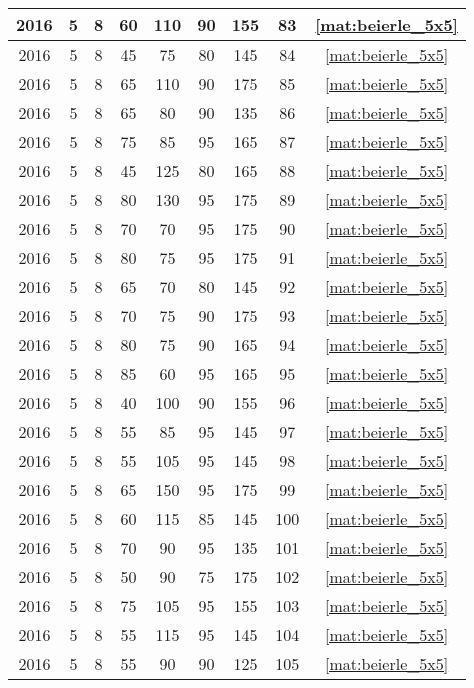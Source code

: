 \begin{longtable}{|c|c|c|c|c|c|c|c|c|}
2016 & 5 & 8 & 60 & 110 & 90 & 155 & 83 & \eqref{mat:beierle_5x5} \\ \hline 
2016 & 5 & 8 & 45 & 75 & 80 & 145 & 84 & \eqref{mat:beierle_5x5} \\ \hline 
2016 & 5 & 8 & 65 & 110 & 90 & 175 & 85 & \eqref{mat:beierle_5x5} \\ \hline 
2016 & 5 & 8 & 65 & 80 & 90 & 135 & 86 & \eqref{mat:beierle_5x5} \\ \hline 
2016 & 5 & 8 & 75 & 85 & 95 & 165 & 87 & \eqref{mat:beierle_5x5} \\ \hline 
2016 & 5 & 8 & 45 & 125 & 80 & 165 & 88 & \eqref{mat:beierle_5x5} \\ \hline 
2016 & 5 & 8 & 80 & 130 & 95 & 175 & 89 & \eqref{mat:beierle_5x5} \\ \hline 
2016 & 5 & 8 & 70 & 70 & 95 & 175 & 90 & \eqref{mat:beierle_5x5} \\ \hline 
2016 & 5 & 8 & 80 & 75 & 95 & 175 & 91 & \eqref{mat:beierle_5x5} \\ \hline 
2016 & 5 & 8 & 65 & 70 & 80 & 145 & 92 & \eqref{mat:beierle_5x5} \\ \hline 
2016 & 5 & 8 & 70 & 75 & 90 & 175 & 93 & \eqref{mat:beierle_5x5} \\ \hline 
2016 & 5 & 8 & 80 & 75 & 90 & 165 & 94 & \eqref{mat:beierle_5x5} \\ \hline 
2016 & 5 & 8 & 85 & 60 & 95 & 165 & 95 & \eqref{mat:beierle_5x5} \\ \hline 
2016 & 5 & 8 & 40 & 100 & 90 & 155 & 96 & \eqref{mat:beierle_5x5} \\ \hline 
2016 & 5 & 8 & 55 & 85 & 95 & 145 & 97 & \eqref{mat:beierle_5x5} \\ \hline 
2016 & 5 & 8 & 55 & 105 & 95 & 145 & 98 & \eqref{mat:beierle_5x5} \\ \hline 
2016 & 5 & 8 & 65 & 150 & 95 & 175 & 99 & \eqref{mat:beierle_5x5} \\ \hline 
2016 & 5 & 8 & 60 & 115 & 85 & 145 & 100 & \eqref{mat:beierle_5x5} \\ \hline 
2016 & 5 & 8 & 70 & 90 & 95 & 135 & 101 & \eqref{mat:beierle_5x5} \\ \hline 
2016 & 5 & 8 & 50 & 90 & 75 & 175 & 102 & \eqref{mat:beierle_5x5} \\ \hline 
2016 & 5 & 8 & 75 & 105 & 95 & 155 & 103 & \eqref{mat:beierle_5x5} \\ \hline 
2016 & 5 & 8 & 55 & 115 & 95 & 145 & 104 & \eqref{mat:beierle_5x5} \\ \hline 
2016 & 5 & 8 & 55 & 90 & 90 & 125 & 105 & \eqref{mat:beierle_5x5} \\ \hline 

\end{longtable}

